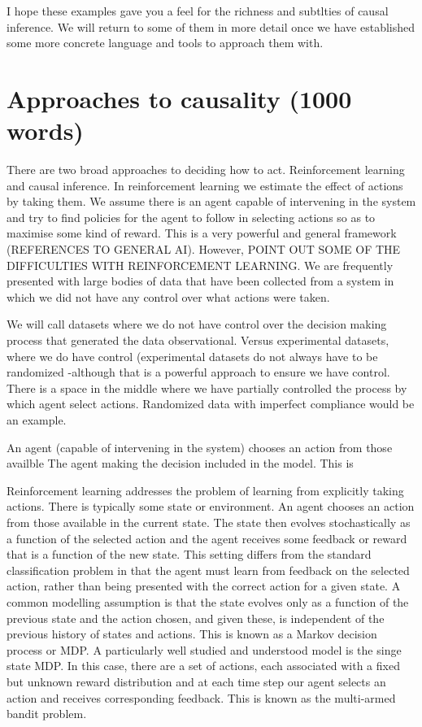 \documentclass[11pt,a4paper,oneside]{book}
\begin{document}
I hope these examples gave you a feel for the richness and subtlties of causal inference. We will return to some of them in more detail once we have established some more concrete language and tools to approach them with.



\section*{Approaches to causality (1000 words)}

There are two broad approaches to deciding how to act. Reinforcement learning and causal inference. In reinforcement learning we estimate the effect of actions by taking them. We assume there is an agent capable of intervening in the system and try to find policies for the agent to follow in selecting actions so as to maximise some kind of reward. This is a very powerful and general framework (REFERENCES TO GENERAL AI). However, POINT OUT SOME OF THE DIFFICULTIES WITH REINFORCEMENT LEARNING. We are frequently presented with large bodies of data that have been collected from a system in which we did not have any control over what actions were taken. 

We will call datasets where we do not have control over the decision making process that generated the data observational. Versus experimental datasets, where we do have control (experimental datasets do not always have to be randomized -although that is a powerful approach to ensure we have control. There is a space in the middle where we have partially controlled the process by which agent select actions. Randomized data with imperfect compliance would be an example.


An agent (capable of intervening in the system) chooses an action from those availble The agent making the decision included in the model. This is

Reinforcement learning addresses the problem of learning from explicitly taking actions. There
is typically some state or environment. An agent chooses an action from those available in the
current state. The state then evolves stochastically as a function of the selected action and
the agent receives some feedback or reward that is a function of the new state. This setting
differs from the standard classification problem in that the agent must learn from feedback on
the selected action, rather than being presented with the correct action for a given state. A
common modelling assumption is that the state evolves only as a function of the previous state
and the action chosen, and given these, is independent of the previous history of states and
actions. This is known as a Markov decision process or MDP. A particularly well studied and
understood model is the singe state MDP. In this case, there are a set of actions, each associated
with a fixed but unknown reward distribution and at each time step our agent selects an action
and receives corresponding feedback. This is known as the multi-armed bandit problem.
\end{document}
